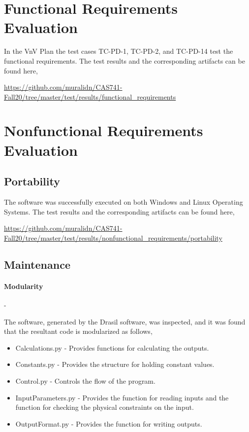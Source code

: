 \documentclass[12pt, titlepage]{article}
\begin{document}
\section{Functional Requirements Evaluation}

In the VnV Plan  \cite{VnVPlan}  the test cases TC-PD-1, TC-PD-2, and TC-PD-14
test the functional requirements. The test results and the corresponding 
artifacts can be found here,

\url{https://github.com/muralidn/CAS741-Fall20/tree/master/test/results/functional_requirements}

\section{Nonfunctional Requirements Evaluation}

\subsection{Portability}

The \progname{} software was successfully executed on both Windows and Linux 
Operating Systems. The test results and the corresponding 
artifacts can be found here,

 \url{https://github.com/muralidn/CAS741-Fall20/tree/master/test/results/nonfunctional_requirements/portability}
		
\subsection{Maintenance}

\paragraph{Modularity} - 

The \progname{} software, generated by the Drasil \cite{Drasil} software, was
inspected, and it was found that the resultant code is modularized as follows,

\begin{itemize}

\item Calculations.py  - Provides functions for calculating the outputs.

\item Constants.py  - Provides the structure for holding constant values.

\item Control.py  - Controls the flow of the program.

\item InputParameters.py - Provides the function for reading inputs and the function 
for checking the physical constraints on the input.

\item OutputFormat.py  -  Provides the function for writing outputs.

\end{itemize}
\end{document}
